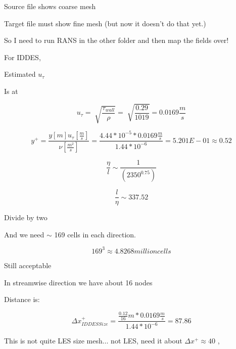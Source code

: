 \documentclass[12pt]{article}
\renewcommand{\_}{\kern-1.5pt\textunderscore\kern-1.5pt}
\begin{document}
Source file shows coarse mesh\par

Target file must show fine mesh (but now it doesn’t do that yet.)\par

So I need to run RANS in the other folder and then map the fields over!\par

For IDDES,\par

Estimated  \( u_{ \tau} \) \par

Is at\par

 \[ u_{ \tau}=\sqrt[]{\frac{ \tau_{wall}}{ \rho }}=\sqrt[]{\frac{0.29}{1019}}=0.0169\frac{m}{s} \] \par

 \[ y^{+}=\frac{y \left[ m \right] u_{ \tau} \left[ \frac{m}{s} \right] }{ \nu  \left[ \frac{m^{2}}{s} \right] }=\frac{4.44\ast10^{-5}\ast0.0169\frac{m}{s}}{1.44\ast10^{-6}}=5.201E-01 \approx 0.52 \] \par

 \[ \frac{ \eta }{l} \sim \frac{1}{ \left( 2350^{0.75} \right) } \] \par

 \[ \frac{l}{ \eta } \sim 337.52 \] \par

Divide by two\par

And we need $ \sim $ 169 cells in each direction.\par

 \[ 169^{3} \approx 4.8268 million cells \] \par


\vspace{\baselineskip}
Still acceptable\par

In streamwise direction we have about 16 nodes\par

Distance is:\par

 \[  \Delta x_{IDDESSize}^{+}=\frac{\frac{0.12}{16}m\ast0.0169\frac{m}{s}}{1.44\ast10^{-6}}=87.86 \] \par

This is not quite LES size mesh$ \ldots $  not LES, need it about  \(  \Delta x^{+} \approx 40 \) ,\par
\end{document}
